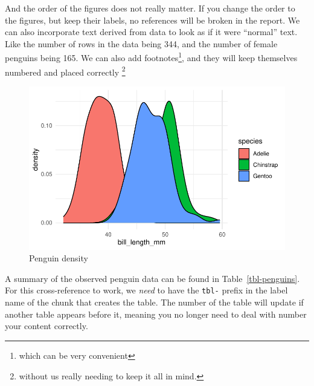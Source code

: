 \documentclass[
  letterpaper,
  DIV=11,
  numbers=noendperiod]{scrartcl}
\begin{document}
And the order of the figures does not really matter. If you change the
order to the figures, but keep their labels, no references will be
broken in the report. We can also incorporate text derived from data to
look as if it were ``normal'' text. Like the number of rows in the data
being 344, and the number of female penguins being 165. We can also add
footnotes\footnote{which can be very convenient}, and they will keep
themselves numbered and placed correctly \footnote{without us really
  needing to keep it all in mind.}

\begin{figure}[hb]

{\centering \includegraphics{03_pdf_example_files/figure-pdf/fig-penguin-density-1.pdf}

}

\caption{\label{fig-penguin-density}Penguin density}

\end{figure}

A summary of the observed penguin data can be found in
Table~\ref{tbl-penguins}. For this cross-reference to work, we
\emph{need} to have the \texttt{tbl-} prefix in the label name of the
chunk that creates the table. The number of the table will update if
another table appears before it, meaning you no longer need to deal with
number your content correctly.\\
\end{document}
